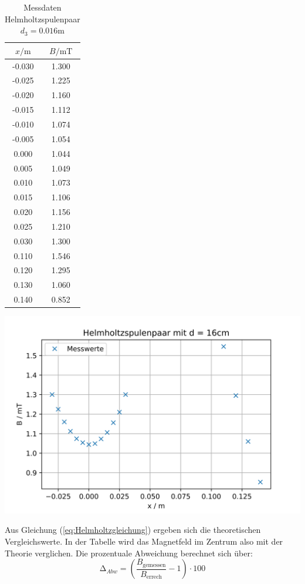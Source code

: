 \begin{table}
  \centering
  \caption{Messdaten Helmholtzspulenpaar $d_{3} = 0.016\unit\m$}
  \begin{tabular}{c c}
    \toprule
    $x / \unit\m$ &  $B / \unit{\milli\tesla}$ \\
    \midrule
    -0.030 &        1.300 \\
    -0.025 &        1.225 \\
    -0.020 &        1.160 \\
    -0.015 &        1.112 \\
    -0.010 &        1.074 \\
    -0.005 &        1.054 \\
     0.000 &        1.044 \\
     0.005 &        1.049 \\
     0.010 &        1.073 \\
     0.015 &        1.106 \\
     0.020 &        1.156 \\
     0.025 &        1.210 \\
     0.030 &        1.300 \\
     0.110 &        1.546 \\
     0.120 &        1.295 \\
     0.130 &        1.060 \\
     0.140 &        0.852 \\
    \bottomrule
  \end{tabular}
\end{table}

  \includegraphics[width=\textwidth]{pictures/Helmholtz3.png}

  Aus Gleichung (\ref{eq:Helmholtzgleichung}) ergeben sich die theoretischen Vergleichswerte.
  In der Tabelle wird das Magnetfeld im Zentrum also mit der Theorie verglichen.
  Die prozentuale Abweichung berechnet sich über:
  \begin{equation}
    \increment_{Abw} = \left(\frac{B_{\text{gemessen}}}{B_{\text{errech}}} - 1\right) \cdot 100
  \end{equation}

